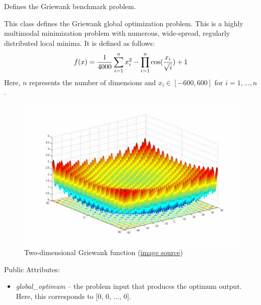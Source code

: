 \documentclass[letterpaper,10pt,english]{sphinxmanual}
\begin{document}

\begin{fulllineitems}
\label{reference:inspyred.benchmarks.Griewank}
Defines the Griewank benchmark problem.

This class defines the Griewank global optimization problem. This 
is a highly multimodal minimization problem with numerous, wide-spread, 
regularly distributed local minima. It is defined as follows:
\begin{gather}
\begin{split}f(x) = \frac{1}{4000} \sum_{i=1}^n x_i^2 - \prod_{i=1}^n \cos(\frac{x_i}{\sqrt{i}}) + 1\end{split}\notag
\end{gather}
Here, $n$ represents the number of dimensions and $x_i \in [-600, 600]$ for $i=1,...,n$.
\begin{figure}[htbp]
\centering
\capstart

\includegraphics{image8891.jpg}
\caption{Two-dimensional Griewank function 
(\href{http://www-optima.amp.i.kyoto-u.ac.jp/member/student/hedar/Hedar\_files/TestGO\_files/Page1905.htm}{image source})}\end{figure}

Public Attributes:
\begin{itemize}
\item {} 
\emph{global\_optimum} -- the problem input that produces the optimum output.
Here, this corresponds to {[}0, 0, ..., 0{]}.

\end{itemize}

\end{fulllineitems}
\end{document}
